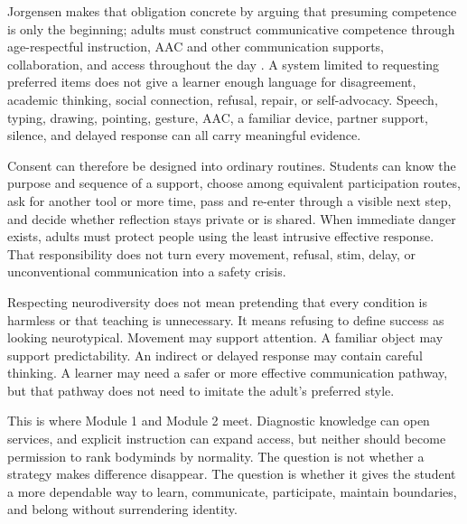 Jorgensen makes that obligation concrete by arguing that presuming competence is only the beginning; adults must construct communicative competence through age-respectful instruction, AAC and other communication supports, collaboration, and access throughout the day \citep{jorgensen2018competence}. A system limited to requesting preferred items does not give a learner enough language for disagreement, academic thinking, social connection, refusal, repair, or self-advocacy. Speech, typing, drawing, pointing, gesture, AAC, a familiar device, partner support, silence, and delayed response can all carry meaningful evidence.

Consent can therefore be designed into ordinary routines. Students can know the purpose and sequence of a support, choose among equivalent participation routes, ask for another tool or more time, pass and re-enter through a visible next step, and decide whether reflection stays private or is shared. When immediate danger exists, adults must protect people using the least intrusive effective response. That responsibility does not turn every movement, refusal, stim, delay, or unconventional communication into a safety crisis.


Respecting neurodiversity does not mean pretending that every condition is harmless or that teaching is unnecessary. It means refusing to define success as looking neurotypical. Movement may support attention. A familiar object may support predictability. An indirect or delayed response may contain careful thinking. A learner may need a safer or more effective communication pathway, but that pathway does not need to imitate the adult's preferred style.

This is where Module 1 and Module 2 meet. Diagnostic knowledge can open services, and explicit instruction can expand access, but neither should become permission to rank bodyminds by normality. The question is not whether a strategy makes difference disappear. The question is whether it gives the student a more dependable way to learn, communicate, participate, maintain boundaries, and belong without surrendering identity.

